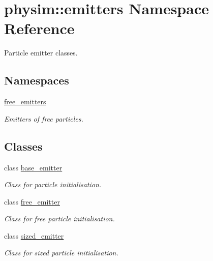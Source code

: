 \hypertarget{namespacephysim_1_1emitters}{}\section{physim\+:\+:emitters Namespace Reference}
\label{namespacephysim_1_1emitters}


Particle emitter classes.  


\subsection*{Namespaces}
\begin{DoxyCompactItemize}
\item 
 \hyperlink{namespacephysim_1_1emitters_1_1free__emitters}{free\+\_\+emitters}
\begin{DoxyCompactList}\small\item\em Emitters of free particles. \end{DoxyCompactList}\end{DoxyCompactItemize}
\subsection*{Classes}
\begin{DoxyCompactItemize}
\item 
class \hyperlink{classphysim_1_1emitters_1_1base__emitter}{base\+\_\+emitter}
\begin{DoxyCompactList}\small\item\em Class for particle initialisation. \end{DoxyCompactList}\item 
class \hyperlink{classphysim_1_1emitters_1_1free__emitter}{free\+\_\+emitter}
\begin{DoxyCompactList}\small\item\em Class for free particle initialisation. \end{DoxyCompactList}\item 
class \hyperlink{classphysim_1_1emitters_1_1sized__emitter}{sized\+\_\+emitter}
\begin{DoxyCompactList}\small\item\em Class for sized particle initialisation. \end{DoxyCompactList}\end{DoxyCompactItemize}
